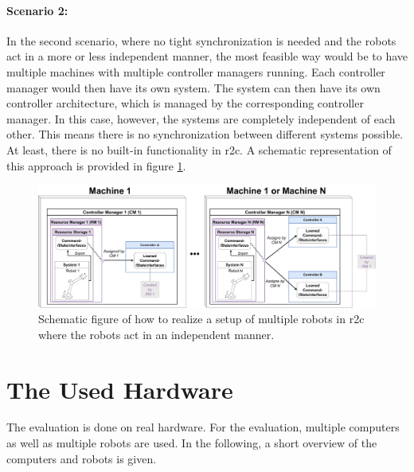 \paragraph{Scenario 2:} 
In the second scenario, where no tight synchronization is needed and the robots act in a more or less independent manner, the most feasible way would be to have multiple machines with multiple controller managers running. Each controller manager would then have its own system. The system can then have its own controller architecture, which is managed by the corresponding controller manager. \newline
In this case, however, the systems are completely independent of each other. This means there is no synchronization between different systems possible. At least, there is no built-in functionality in \gls{r2c}. A schematic representation of this approach is provided in figure \ref{c3_fig_r2c_mr_is}.
\begin{figure}[htbp]
	\centering
	\includegraphics[width=1\textwidth]{Figures/c3/multiple_independent_robots_current.pdf}
	\caption{Schematic figure of how to realize a setup of multiple robots in \gls{r2c} where the robots act in an independent manner.}
	\label{c3_fig_r2c_mr_is}
\end{figure}






\section{The Used Hardware}
The evaluation is done on real hardware. For the evaluation, multiple computers as well as multiple robots are used. In the following, a short overview of the computers and robots is given.
